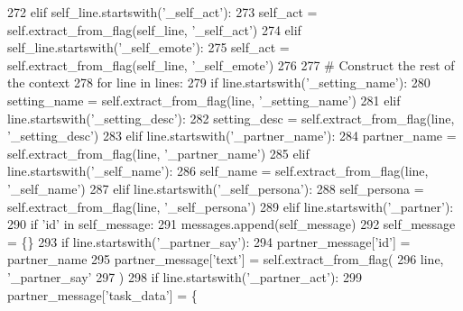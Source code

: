 \begin{DoxyCode}
272             \textcolor{keywordflow}{elif} self\_line.startswith(\textcolor{stringliteral}{'\_self\_act'}):
273                 self\_act = self.extract\_from\_flag(self\_line, \textcolor{stringliteral}{'\_self\_act'})
274             \textcolor{keywordflow}{elif} self\_line.startswith(\textcolor{stringliteral}{'\_self\_emote'}):
275                 self\_act = self.extract\_from\_flag(self\_line, \textcolor{stringliteral}{'\_self\_emote'})
276 
277         \textcolor{comment}{# Construct the rest of the context}
278         \textcolor{keywordflow}{for} line \textcolor{keywordflow}{in} lines:
279             \textcolor{keywordflow}{if} line.startswith(\textcolor{stringliteral}{'\_setting\_name'}):
280                 setting\_name = self.extract\_from\_flag(line, \textcolor{stringliteral}{'\_setting\_name'})
281             \textcolor{keywordflow}{elif} line.startswith(\textcolor{stringliteral}{'\_setting\_desc'}):
282                 setting\_desc = self.extract\_from\_flag(line, \textcolor{stringliteral}{'\_setting\_desc'})
283             \textcolor{keywordflow}{elif} line.startswith(\textcolor{stringliteral}{'\_partner\_name'}):
284                 partner\_name = self.extract\_from\_flag(line, \textcolor{stringliteral}{'\_partner\_name'})
285             \textcolor{keywordflow}{elif} line.startswith(\textcolor{stringliteral}{'\_self\_name'}):
286                 self\_name = self.extract\_from\_flag(line, \textcolor{stringliteral}{'\_self\_name'})
287             \textcolor{keywordflow}{elif} line.startswith(\textcolor{stringliteral}{'\_self\_persona'}):
288                 self\_persona = self.extract\_from\_flag(line, \textcolor{stringliteral}{'\_self\_persona'})
289             \textcolor{keywordflow}{elif} line.startswith(\textcolor{stringliteral}{'\_partner'}):
290                 \textcolor{keywordflow}{if} \textcolor{stringliteral}{'id'} \textcolor{keywordflow}{in} self\_message:
291                     messages.append(self\_message)
292                     self\_message = \{\}
293                 \textcolor{keywordflow}{if} line.startswith(\textcolor{stringliteral}{'\_partner\_say'}):
294                     partner\_message[\textcolor{stringliteral}{'id'}] = partner\_name
295                     partner\_message[\textcolor{stringliteral}{'text'}] = self.extract\_from\_flag(
296                         line, \textcolor{stringliteral}{'\_partner\_say'}
297                     )
298                 \textcolor{keywordflow}{if} line.startswith(\textcolor{stringliteral}{'\_partner\_act'}):
299                     partner\_message[\textcolor{stringliteral}{'task\_data'}] = \{

\end{DoxyCode}
